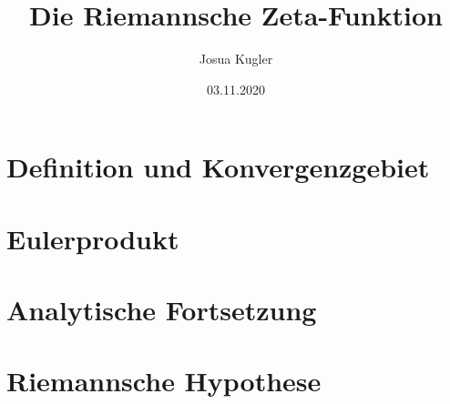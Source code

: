 \documentclass{beamer}
\title{Die Riemannsche Zeta-Funktion}
\author{Josua Kugler}
\date{03.11.2020}
\begin{document}
\titlepage
\section{Definition und Konvergenzgebiet}


\section{Eulerprodukt}


\section{Analytische Fortsetzung}









\section{Riemannsche Hypothese}

\end{document}
